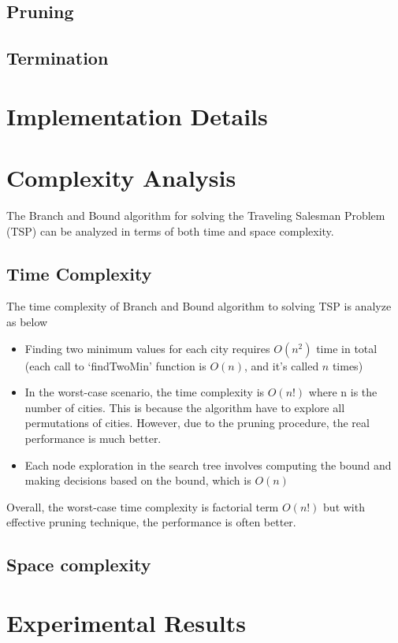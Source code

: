 \documentclass[a4paper]{article}
\begin{document}
\subsection{Pruning}
\subsection{Termination}

\section{Implementation Details} %
\section{Complexity Analysis} %
The Branch and Bound algorithm for solving the Traveling Salesman Problem (TSP) can be analyzed in terms of both time and space complexity.
\subsection{Time Complexity}
The time complexity of Branch and Bound algorithm to solving TSP is analyze as below
\begin{itemize}
    \item Finding two minimum values for each city requires $O(n^2)$ time in total (each call to `findTwoMin' function is $O(n)$, and it's called $n$ times)
    \item In the worst-case scenario, the time complexity is $O(n!)$ where n is the number of cities. This is because the algorithm have to explore all permutations of cities. However, due to the pruning procedure, the real performance is much better.
    \item Each node exploration in the search tree involves computing the bound and making decisions based on the bound, which is $O(n)$
\end{itemize}
Overall, the worst-case time complexity is factorial term $O(n!)$ but with effective pruning technique, the performance is often better. 
\subsection{Space complexity}


\section{Experimental Results}
\end{document}
